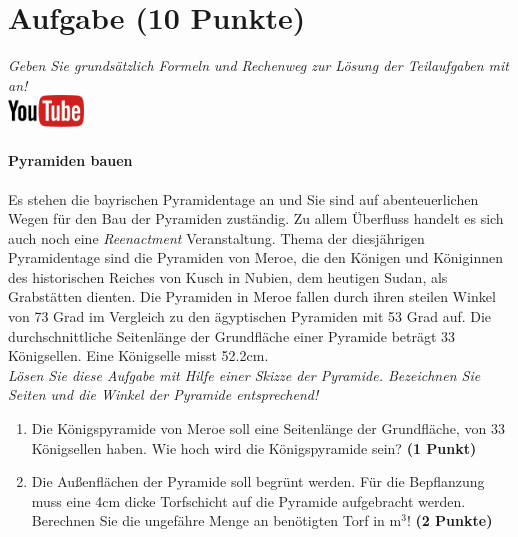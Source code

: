 \documentclass[a4paper, 10pt]{scrartcl}\usepackage[]{graphicx}\usepackage[]{xcolor}
\begin{document}
\clearpage\null

 
\clearpage

\section{Aufgabe \hfill (10 Punkte)}

\textit{Geben Sie grunds{\"a}tzlich Formeln und Rechenweg zur L{\"o}sung der
  Teilaufgaben mit an!} \\[1Ex]

\hfill\href{https://youtu.be/tDgr6fpkkYA}{\includegraphics[width =
  2cm]{img/youtube}} %
\hspace{2Ex}

\paragraph{Pyramiden bauen}



Es stehen die bayrischen Pyramidentage an und Sie sind auf
abenteuerlichen Wegen f{\"u}r den Bau der Pyramiden zust{\"a}ndig. Zu allem
{\"U}berfluss handelt es sich auch noch eine \textit{Reenactment}
Veranstaltung. Thema der diesj{\"a}hrigen Pyramidentage sind die Pyramiden von
Meroe, die den K{\"o}nigen und K{\"o}niginnen des historischen Reiches von Kusch in
Nubien, dem heutigen Sudan, als Grabst{\"a}tten dienten. Die Pyramiden in Meroe
fallen durch ihren steilen Winkel von 73 Grad im Vergleich zu
den {\"a}gyptischen Pyramiden mit 53 Grad auf. Die durchschnittliche
Seitenl{\"a}nge der Grundfl{\"a}che einer Pyramide betr{\"a}gt 33 K{\"o}nigsellen. Eine K{\"o}nigselle
misst 52.2cm.\\

\textit{L{\"o}sen Sie diese Aufgabe mit Hilfe einer Skizze der Pyramide. Bezeichnen
  Sie Seiten und die Winkel der Pyramide entsprechend!}

\begin{enumerate}
\item Die K{\"o}nigspyramide von Meroe soll eine Seitenl{\"a}nge der Grundfl{\"a}che‚
  von 33 K{\"o}nigsellen haben. Wie hoch wird die K{\"o}nigspyramide
  sein? \textbf{(1 Punkt)}
\item Die Au{\ss}enfl{\"a}chen der Pyramide soll begr{\"u}nt werden. F{\"u}r die
  Bepflanzung muss eine 4cm dicke Torfschicht auf die
  Pyramide aufgebracht werden. Berechnen Sie die ungef{\"a}hre Menge an
  ben{\"o}tigten Torf in m$^3$! \textbf{(2 Punkte)}
\end{enumerate}
\end{document}
